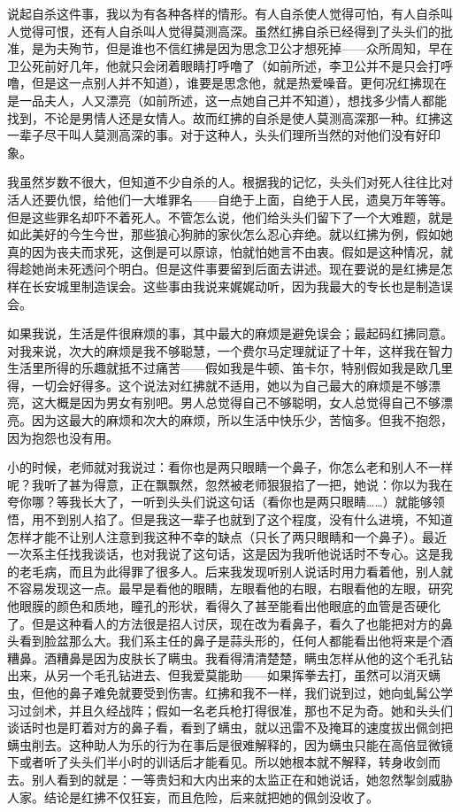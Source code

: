 说起自杀这件事，我以为有各种各样的情形。有人自杀使人觉得可怕，有人自杀叫人觉得可恨，还有人自杀叫人觉得莫测高深。虽然红拂自杀已经得到了头头们的批准，是为夫殉节，但是谁也不信红拂是因为思念卫公才想死掉——众所周知，早在卫公死前好几年，他就只会闭着眼睛打呼噜了（如前所述，李卫公并不是只会打呼噜，但是这一点别人并不知道），谁要是思念他，就是热爱噪音。更何况红拂现在是一品夫人，人又漂亮（如前所述，这一点她自己并不知道），想找多少情人都能找到，不论是男情人还是女情人。故而红拂的自杀是使人莫测高深那一种。红拂这一辈子尽干叫人莫测高深的事。对于这种人，头头们理所当然的对他们没有好印象。 

我虽然岁数不很大，但知道不少自杀的人。根据我的记忆，头头们对死人往往比对活人还要仇恨，给他们一大堆罪名——自绝于上面，自绝于人民，遗臭万年等等。但是这些罪名却吓不着死人。不管怎么说，他们给头头们留下了一个大难题，就是如此美好的今生今世，那些狼心狗肺的家伙怎么忍心弃绝。就以红拂为例，假如她真的因为丧夫而求死，这倒是可以原谅，怕就怕她言不由衷。假如是这种情况，就得趁她尚未死透问个明白。但是这件事要留到后面去讲述。现在要说的是红拂是怎样在长安城里制造误会。这些事由我说来娓娓动听，因为我最大的专长也是制造误会。 

如果我说，生活是件很麻烦的事，其中最大的麻烦是避免误会；最起码红拂同意。对我来说，次大的麻烦是我不够聪慧，一个费尔马定理就证了十年，这样我在智力生活里所得的乐趣就抵不过痛苦——假如我是牛顿、笛卡尔，特别假如我是欧几里得，一切会好得多。这个说法对红拂就不适用，她以为自己最大的麻烦是不够漂亮，这大概是因为男女有别吧。男人总觉得自己不够聪明，女人总觉得自己不够漂亮。因为这最大的麻烦和次大的麻烦，所以生活中快乐少，苦恼多。但我不抱怨，因为抱怨也没有用。 

小的时候，老师就对我说过：看你也是两只眼睛一个鼻子，你怎么老和别人不一样呢？我听了甚为得意，正在飘飘然，忽然被老师狠狠掐了一把，她说：你以为我在夸你哪？等我长大了，一听到头头们说这句话（看你也是两只眼睛……）就能够领悟，用不到别人掐了。但是我这一辈子也就到了这个程度，没有什么进境，不知道怎样才能不让别人注意到我这种不幸的缺点（只长了两只眼睛和一个鼻子）。最近一次系主任找我谈话，也对我说了这句话，这是因为我听他说话时不专心。这是我的老毛病，而且为此得罪了很多人。后来我发现听别人说话时用力看着他，别人就不容易发现这一点。最早是看他的眼睛，左眼看他的右眼，右眼看他的左眼，研究他眼膜的颜色和质地，瞳孔的形状，看得久了甚至能看出他眼底的血管是否硬化了。但是这种看人的方法很是招人讨厌，现在改为看鼻子，看久了也能把对方的鼻头看到脸盆那么大。我们系主任的鼻子是蒜头形的，任何人都能看出他将来是个酒糟鼻。酒糟鼻是因为皮肤长了瞒虫。我看得清清楚楚，瞒虫怎样从他的这个毛孔钻出来，从另一个毛孔钻进去、但我爱莫能助——如果挥拳去打，虽然可以消灭螨虫，但他的鼻子难免就要受到伤害。红拂和我不一样，我们说到过，她向虬髯公学习过剑术，并且久经战阵；假如一名老兵枪打得很准，那也不足为奇。她和头头们谈话时也是盯着对方的鼻子看，看到了螨虫，就以迅雷不及掩耳的速度拔出佩剑把螨虫削去。这种助人为乐的行为在事后是很难解释的，因为螨虫只能在高倍显微镜下或者听了头头们半小时的训话后才能看见。所以她根本就不解释，转身收剑而去。别人看到的就是：一等贵妇和大内出来的太监正在和她说话，她忽然掣剑威胁人家。结论是红拂不仅狂妄，而且危险，后来就把她的佩剑没收了。 

